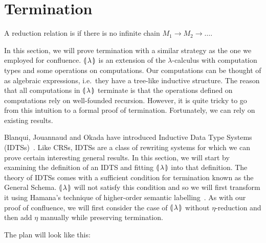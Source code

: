 \section{Termination}
\label{sec:termination}

\begin{definition}
  A reduction relation is  if there is no infinite chain
  $M_1 \to M_2 \to \ldots$.
\end{definition}

In this section, we will prove termination with a similar strategy as the
one we employed for confluence. $\llparenthesis \, \lambda \, \rrparenthesis$ is an extension of the
$\lambda$-calculus with computation types and some operations on
computations. Our computations can be thought of as algebraic expressions,
i.e.\ they have a tree-like inductive structure. The reason that all
computations in $\llparenthesis \, \lambda \, \rrparenthesis$ terminate is that the operations defined on
computations rely on well-founded recursion. However, it is quite tricky to
go from this intuition to a formal proof of termination. Fortunately, we
can rely on existing results.

Blanqui, Jouannaud and Okada have introduced Inductive Data Type Systems
(IDTSs)~\cite{blanqui2002inductive,blanqui2000termination}. Like CRSs,
IDTSs are a class of rewriting systems for which we can prove certain
interesting general results. In this section, we will start by examining
the definition of an IDTS and fitting $\llparenthesis \, \lambda \, \rrparenthesis$ into that
definition. The theory of IDTSs comes with a sufficient condition for
termination known as the General Schema. $\llparenthesis \, \lambda \, \rrparenthesis$ will not
satisfy this condition and so we will first transform it using Hamana's
technique of higher-order semantic labelling~\cite{hamana2007higher}. As
with our proof of confluence, we will first consider the case of
$\llparenthesis \, \lambda \, \rrparenthesis$ without $\eta$-reduction and then add $\eta$ manually
while preserving termination.

The plan will look like this:

